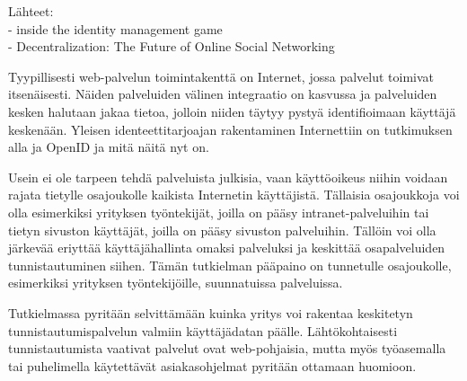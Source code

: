 Lähteet:\\
- inside the identity management game \cite{inside_the_identity_management_game}\\
- Decentralization: The Future of Online Social Networking \cite{decentralisations}

Tyypillisesti web-palvelun toimintakenttä on Internet, jossa palvelut toimivat itsenäisesti. Näiden palveluiden välinen integraatio on kasvussa ja palveluiden kesken halutaan jakaa tietoa, jolloin niiden täytyy pystyä identifioimaan käyttäjä keskenään. Yleisen identeettitarjoajan rakentaminen Internettiin on tutkimuksen alla ja OpenID ja mitä näitä nyt on. 

Usein ei ole tarpeen tehdä palveluista julkisia, vaan käyttöoikeus niihin voidaan rajata tietylle osajoukolle kaikista Internetin käyttäjistä. Tällaisia osajoukkoja voi olla esimerkiksi yrityksen työntekijät, joilla on pääsy intranet-palveluihin tai tietyn sivuston käyttäjät, joilla on pääsy sivuston palveluihin. Tällöin voi olla järkevää eriyttää käyttäjähallinta omaksi palveluksi ja keskittää osapalveluiden tunnistautuminen siihen. Tämän tutkielman pääpaino on tunnetulle osajoukolle, esimerkiksi yrityksen työntekijöille, suunnatuissa palveluissa.

Tutkielmassa pyritään selvittämään kuinka yritys voi rakentaa keskitetyn tunnistautumispalvelun valmiin käyttäjädatan päälle. Lähtökohtaisesti tunnistautumista vaativat palvelut ovat web-pohjaisia, mutta myös työasemalla tai puhelimella käytettävät asiakasohjelmat pyritään ottamaan huomioon.
